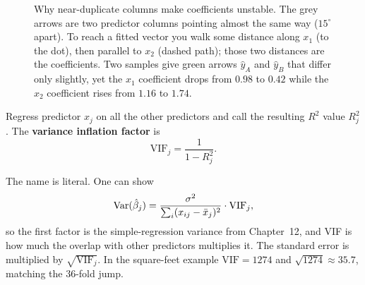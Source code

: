 \begin{figure}[H]
\centering
{}
\caption{Why near-duplicate columns make coefficients unstable. The grey arrows are two
predictor columns pointing almost the same way ($15^\circ$ apart). To reach a fitted
vector you walk some distance along $x_1$ (to the dot), then parallel to $x_2$ (dashed
path); those two distances are the coefficients. Two samples give green arrows
$\hat y_A$ and $\hat y_B$ that differ only slightly, yet the $x_1$ coefficient drops from
$0.98$ to $0.42$ while the $x_2$ coefficient rises from $1.16$ to $1.74$.}
\label{fig:mlr-collinear-geom}
\end{figure}

\begin{definition}
Regress predictor $x_j$ on all the other predictors and call the resulting $R^2$ value
$R_j^2$. The \textbf{variance inflation factor} is
\[
  \text{VIF}_j = \frac{1}{1 - R_j^2}.
\]
\end{definition}

The name is literal. One can show
\[
  \operatorname{Var}(\hat\beta_j) = \frac{\sigma^2}{\sum_i (x_{ij} - \bar x_j)^2}\cdot \text{VIF}_j ,
\]
so the first factor is the simple-regression variance from Chapter~12, and VIF is how
much the overlap with other predictors multiplies it. The standard error is multiplied
by $\sqrt{\text{VIF}_j}$. In the square-feet example $\text{VIF}=1274$ and
$\sqrt{1274}\approx 35.7$, matching the $36$-fold jump.

